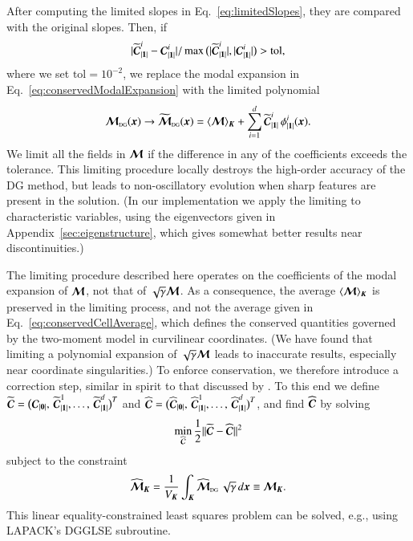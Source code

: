 \documentclass[11pt,letterpaper,twoside,english,final]{article}
\begin{document}
After computing the limited slopes in Eq.~\eqref{eq:limitedSlopes}, they are compared with the original slopes.  
Then, if
\begin{equation}
  |\widetilde{\boldsymbol{\mathcal{C}}}_{|\boldsymbol{1}|}^{i}-\boldsymbol{\mathcal{C}}_{|\boldsymbol{1}|}^{i}|/\max\big(|\widetilde{\boldsymbol{\mathcal{C}}}_{|\boldsymbol{1}|}^{i}|,|\boldsymbol{\mathcal{C}}_{|\boldsymbol{1}|}^{i}|\big)>\text{tol},
\end{equation}
where we set $\text{tol}=10^{-2}$, we replace the modal expansion in Eq.~\eqref{eq:conservedModalExpansion} with the limited polynomial
\begin{equation}
  \boldsymbol{\mathcal{M}}_{\mbox{\tiny DG}}(\boldsymbol{x})
  \to\widetilde{\boldsymbol{\mathcal{M}}}_{\mbox{\tiny DG}}(\boldsymbol{x})
  =\langle\boldsymbol{\mathcal{M}}\rangle_{\boldsymbol{K}}+\sum_{i=1}^{d}\widetilde{\boldsymbol{\mathcal{C}}}_{|\boldsymbol{1}|}^{i}\,\phi_{|\boldsymbol{1}|}^{i}(\boldsymbol{x}).  
  \label{eq:conservedModalExpansionLimited}
\end{equation}
We limit all the fields in $\boldsymbol{\mathcal{M}}$ if the difference in any of the coefficients exceeds the tolerance.  
This limiting procedure locally destroys the high-order accuracy of the DG method, but leads to non-oscillatory evolution when sharp features are present in the solution.  
(In our implementation we apply the limiting to characteristic variables, using the eigenvectors given in Appendix~\ref{sec:eigenstructure}, which gives somewhat better results near discontinuities.)

The limiting procedure described here operates on the coefficients of the modal expansion of $\boldsymbol{\mathcal{M}}$, not that of $\sqrt{\gamma}\boldsymbol{\mathcal{M}}$.  
As a consequence, the average $\langle\boldsymbol{\mathcal{M}}\rangle_{\boldsymbol{K}}$ is preserved in the limiting process, and not the average given in Eq.~\eqref{eq:conservedCellAverage}, which defines the conserved quantities governed by the two-moment model in curvilinear coordinates.  
(We have found that limiting a polynomial expansion of $\sqrt{\gamma}\boldsymbol{\mathcal{M}}$ leads to inaccurate results, especially near coordinate singularities.)  
To enforce conservation, we therefore introduce a correction step, similar in spirit to that discussed by \citet{radiceRezzolla_2011}.  
To this end we define $\widetilde{\boldsymbol{\mathcal{C}}}=\big(\boldsymbol{\mathcal{C}}_{|\boldsymbol{0}|},\,\widetilde{\boldsymbol{\mathcal{C}}}_{|\boldsymbol{1}|}^{1},\ldots,\,\widetilde{\boldsymbol{\mathcal{C}}}_{|\boldsymbol{1}|}^{d}\big)^{T}$ and $\widehat{\boldsymbol{\mathcal{C}}}=\big(\widehat{\boldsymbol{\mathcal{C}}}_{|\boldsymbol{0}|},\,\widehat{\boldsymbol{\mathcal{C}}}_{|\boldsymbol{1}|}^{1},\ldots,\,\widehat{\boldsymbol{\mathcal{C}}}_{|\boldsymbol{1}|}^{d}\big)^{T}$, and find $\widehat{\boldsymbol{\mathcal{C}}}$ by solving
\begin{equation}
  \min_{\widehat{\boldsymbol{\mathcal{C}}}}\frac{1}{2}||\widetilde{\boldsymbol{\mathcal{C}}}-\widehat{\boldsymbol{\mathcal{C}}}||^{2}
\end{equation}
subject to the constraint
\begin{equation}
  \widehat{\boldsymbol{\mathcal{M}}}_{\boldsymbol{K}}=\frac{1}{V_{\boldsymbol{K}}}\int_{\boldsymbol{K}}\widehat{\boldsymbol{\mathcal{M}}}_{\mbox{\tiny DG}}\,\sqrt{\gamma}\,d\boldsymbol{x}\equiv\boldsymbol{\mathcal{M}}_{\boldsymbol{K}}.  
\end{equation}
This linear equality-constrained least squares problem can be solved, e.g., using LAPACK's DGGLSE subroutine.  
\end{document}
